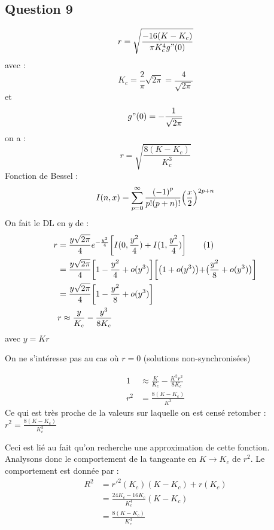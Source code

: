 \documentclass[a4paper, 11pt]{article}
\begin{document}
\subsection*{Question 9}
\begin{equation*}
    r = \sqrt{\frac{-16 (K-K_{c})}{\pi K_{c}^{4} g"(0)}}
\end{equation*}
avec : 
\begin{equation*}
    K_{c} = \frac{2}{\pi} \sqrt{2\pi} = \frac{4}{\sqrt{2\pi}}
\end{equation*}
 et 
 \begin{equation*}
    g"(0) = -\frac{1}{\sqrt{2\pi}}
\end{equation*}
on a : 
\begin{equation*}
    \boxed{r = \sqrt{ \frac{8 (K-K_{c})}{ K_{c}^{3}}}}
\end{equation*}
Fonction de Bessel : 
\begin{equation*}
    I(n,x) = \displaystyle \sum_{p=0}^{\infty} \frac{{(-1)}^{p}}{p!(p+n)!} {\Bigl( \frac{x}{2}\Bigl)}^{2p+n}
\end{equation*}
On fait le DL en $y$ de : 
\begin{align*} \label{eq:DL}
r &= \frac{y\sqrt{2\pi}}{4} e^{-\frac{y^{2}}{4}} \bigg[ I(0,\frac{y^{2}}{4})+I(1,\frac{y^{2}}{4}) \bigg] \refstepcounter{equation}\tag{\theequation} \\
&= \frac{y\sqrt{2\pi}}{4} \bigg[ 1 - \frac{{y}^{2}}{4} + o({{y}^{3}}) \bigg] \bigg[ \bigl( 1 + o({{y}^{3}}) \bigl) + \bigl( \frac{{y}^{2}}{8} + o({{y}^{3}}) \bigl) \bigg] \\
&= \frac{y\sqrt{2\pi}}{4} \bigg[ 1 - \frac{{y}^{2}}{8} + o({{y}^{3}}) \bigg] \\
&r \approx \frac{y}{K_{c}}-\frac{y^{3}}{8K_{c}}
\end{align*}
avec $y = Kr$

 On ne s'intéresse pas au cas où $r = 0$ (solutions non-synchronisées)

\begin{align*}
1& \approx \frac{K}{K_{c}}-\frac{K^{2}r^{2}}{8K_{c}}\\
r^{2}& = \frac{8(K-K_{c})}{K^{3}}
\end{align*}
Ce qui est très proche de la valeurs sur laquelle on est censé retomber  : $r^{2} = \frac{8 (K-K_{c})}{ K_{c}^{3}}$

Ceci est lié au fait qu'on recherche une approximation de cette fonction.
Analysons donc le comportement de la tangeante en $K\longrightarrow K_c$ de $r^{2}$.
Le comportement est donnée par :  
\begin{align*}
R^{2} &= r'^{2}(K_{c})(K-K_{c}) + r(K_{c})\\
&= \frac{24K_{c}-16K_{c}}{K_{c}^{4}}(K-K_{c})\\
& = \frac{8 (K-K_{c})}{ K_{c}^{3}}\\
\end{align*}
\end{document}
